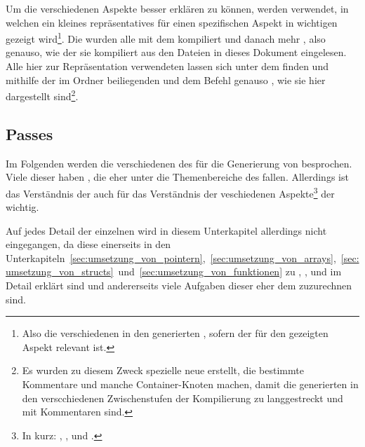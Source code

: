 Um die verschiedenen Aspekte besser erklären zu können, werden  verwendet, in welchen ein kleines repräsentatives  für einen spezifischen Aspekt in wichtigen  gezeigt wird\footnote{Also die verschiedenen in den  generierten , sofern der  für den gezeigten Aspekt relevant ist.}. Die  wurden alle mit dem  kompiliert und danach  mehr , also genauso, wie der  sie kompiliert aus den Dateien in dieses Dokument eingelesen. Alle hier zur Repräsentation verwendeten  lassen sich unter dem  finden und mithilfe der im Ordner  beiliegenden  und dem Befehl  genauso , wie sie hier dargestellt sind\footnote{Es wurden zu diesem Zweck spezielle neue  erstellt, die bestimmte Kommentare  und manche Container-Knoten  machen, damit die generierten  in den verscchiedenen Zwischenstufen der Kompilierung  zu langgestreckt und  mit Kommentaren sind.}.


\subsection{Passes}
\label{sec:passes}

Im Folgenden werden die verschiedenen  des  für die Generierung von  besprochen. Viele dieser  haben , die eher unter die Themenbereiche des  fallen. Allerdings ist das Verständnis der  auch für das Verständnis der veschiedenen Aspekte\footnote{In kurz: , ,  und .} der  wichtig.

Auf jedes Detail der einzelnen  wird in diesem Unterkapitel allerdings nicht eingegangen, da diese einerseits in den Unterkapiteln~\ref{sec:umsetzung_von_pointern},~\ref{sec:umsetzung_von_arrays},~\ref{sec:umsetzung_von_structs}~und~\ref{sec:umsetzung_von_funktionen} zu ,  ,  und  im Detail erklärt sind und andererseits viele Aufgaben dieser  eher dem  zuzurechnen sind.

